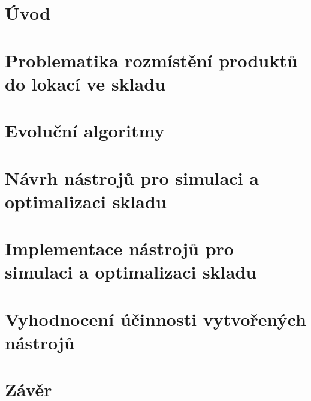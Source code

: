\chapter{Úvod}



\chapter{Problematika rozmístění produktů do lokací ve skladu}
\label{SLAP}



\chapter{Evoluční algoritmy}
\label{EA}



\chapter{Návrh nástrojů pro simulaci a optimalizaci skladu}
\label{navrhNastroju}



\chapter{Implementace nástrojů pro simulaci a optimalizaci skladu}
\label{implementaceNastroju}



\chapter{Vyhodnocení účinnosti vytvořených nástrojů}
\label{vyhodnoceniNastroju}



\chapter{Závěr}
